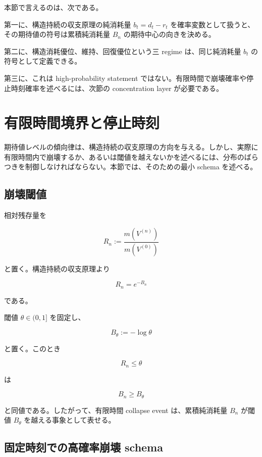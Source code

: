 \documentclass[12pt,a4paper]{article}
\begin{document}
本節で言えるのは、次である。

第一に、構造持続の収支原理の純消耗量 \(b_{t}=d_{t}-r_{t}\) を確率変数として扱うと、その期待値の符号は累積純消耗量 \(B_{n}\) の期待中心の向きを決める。

第二に、構造消耗優位、維持、回復優位という三 regime は、同じ純消耗量 \(b_{t}\) の符号として定義できる。

第三に、これは high-probability statement ではない。有限時間で崩壊確率や停止時刻確率を述べるには、次節の concentration layer が必要である。

\section{有限時間境界と停止時刻}\label{ux6709ux9650ux6642ux9593ux5883ux754cux3068ux505cux6b62ux6642ux523b}

期待値レベルの傾向律は、構造持続の収支原理の方向を与える。しかし、実際に有限時間内で崩壊するか、あるいは閾値を越えないかを述べるには、分布のばらつきを制御しなければならない。本節では、そのための最小 schema を述べる。

\subsection{崩壊閾値}\label{ux5d29ux58caux95beux5024}

相対残存量を

\[
R_{n} := \frac{m(V^{(n)})}{m(V^{(0)})}
\]

と置く。構造持続の収支原理より

\[
R_{n} = e^{-B_{n}}
\]

である。

閾値 \(\theta\in(0,1]\) を固定し、

\[
B_\theta := -\log \theta
\]

と置く。このとき

\[
R_{n} \le \theta
\]

は

\[
B_{n} \ge B_\theta
\]

と同値である。したがって、有限時間 collapse event は、累積純消耗量 \(B_{n}\) が閾値 \(B_\theta\) を越える事象として表せる。

\subsection{固定時刻での高確率崩壊 schema}\label{ux56faux5b9aux6642ux523bux3067ux306eux9ad8ux78baux7387ux5d29ux58ca-schema}
\end{document}
